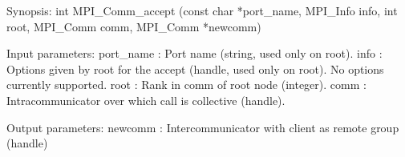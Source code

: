Synopsis:
int MPI_Comm_accept
   (const char *port_name, MPI_Info info, int root,
    MPI_Comm comm, MPI_Comm *newcomm)

Input parameters:
port_name : Port name (string, used only on root).
info : Options given by root for the accept (handle, used only on
    root). No options currently supported.
root : Rank in comm of root node (integer).
comm : Intracommunicator over which call is collective (handle).

Output parameters:
newcomm : Intercommunicator with client as remote group (handle)
